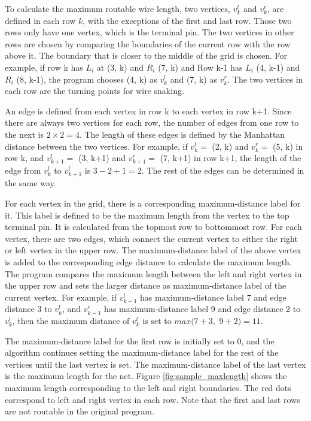 To calculate the maximum routable wire length, two vertices, $v^l_k$ and $v^r_k$, are defined in each row $k$, with the exceptions of the first and last row. Those two rows only have one vertex, which is the terminal pin. The two vertices in other rows are chosen by comparing the boundaries of the current row with the row above it. The boundary that is closer to the middle of the grid is chosen. For example, if row k has $L_i$ at (3, k) and $R_i$ (7, k) and Row k-1 has $L_i$ (4, k-1) and $R_i$ (8, k-1), the program chooses (4, k) as $v^l_k$ and (7, k) as $v^r_k$. The two vertices in each row are the turning points for wire snaking. 

An edge is defined from each vertex in row k to each vertex in row k+1. Since there are always two vertices for each row, the number of edges from one row to the next is $2\times2=4$. The length of these edges is defined by the Manhattan distance between the two vertices. For example, if $v^l_k=$ (2, k) and $v^r_k=$ (5, k) in row k, and $v^l_{k+1}=$ (3, k+1) and $v^r_{k+1}=$ (7, k+1) in row k+1, the length of the edge from $v^l_k$ to $v^l_{k+1}$ is $3-2+1=2$. The rest of the edges can be determined in the same way. 

For each vertex in the grid, there is a corresponding maximum-distance label for it. This label is defined to be the maximum length from the vertex to the top terminal pin. It is calculated from the topmost row to bottommost row. For each vertex, there are two edges, which connect the current vertex to either the right or left vertex in the upper row. The maximum-distance label of the above vertex is added to the corresponding edge distance to calculate the maximum length. The program compares the maximum length between the left and right vertex in the upper row and sets the larger distance as maximum-distance label of the current vertex. For example, if $v^l_{k-1}$ has maximum-distance label 7 and edge distance 3 to $v^l_k$, and $v^r_{k-1}$ has maximum-distance label 9 and edge distance 2 to $v^l_k$, then the maximum distance of $v^l_k$ is set to $max(7+3,$ $9+2)=11$. 

The maximum-distance label for the first row is initially set to 0, and the algorithm continues setting the maximum-distance label for the rest of the vertices until the last vertex is set. The maximum-distance label of the last vertex is the maximum length for the net. Figure \ref{fig:sample_maxlength} shows the maximum length corresponding to the left and right boundaries. The red dots correspond to left and right vertex in each row. Note that the first and last rows are not routable in the original program.

